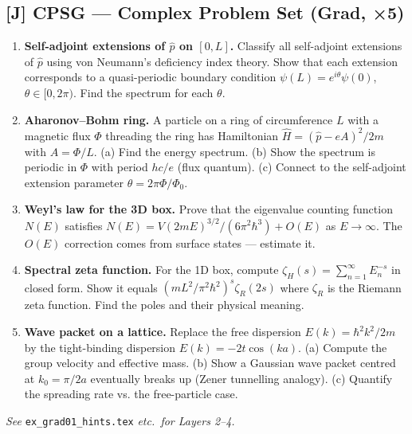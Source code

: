 \subsection*{[J] CPSG — Complex Problem Set (Grad, ×5)}
\begin{tcolorbox}[gradprobbox, title={CPSG · L01 · Tiers 4–5 · 5–10 hrs}]
\begin{enumerate}[label=\textbf{Ex\arabic*.}]
  \item \textbf{Self-adjoint extensions of $\hat{p}$ on $[0,L]$.}
    Classify all self-adjoint extensions of $\hat{p}$ using von Neumann's deficiency index theory. Show that each extension corresponds to a quasi-periodic boundary condition $\psi(L) = e^{i\theta}\psi(0)$, $\theta\in[0,2\pi)$. Find the spectrum for each $\theta$.
  \item \textbf{Aharonov–Bohm ring.}
    A particle on a ring of circumference $L$ with a magnetic flux $\Phi$ threading the ring has Hamiltonian $\hat{H} = (\hat{p}-eA)^2/2m$ with $A = \Phi/L$. (a) Find the energy spectrum. (b) Show the spectrum is periodic in $\Phi$ with period $hc/e$ (flux quantum). (c) Connect to the self-adjoint extension parameter $\theta = 2\pi\Phi/\Phi_0$.
  \item \textbf{Weyl's law for the 3D box.}
    Prove that the eigenvalue counting function $N(E)$ satisfies $N(E) = V(2mE)^{3/2}/(6\pi^2\hbar^3) + O(E)$ as $E\to\infty$. The $O(E)$ correction comes from surface states — estimate it.
  \item \textbf{Spectral zeta function.}
    For the 1D box, compute $\zeta_H(s) = \sum_{n=1}^\infty E_n^{-s}$ in closed form. Show it equals $(mL^2/\pi^2\hbar^2)^s \zeta_R(2s)$ where $\zeta_R$ is the Riemann zeta function. Find the poles and their physical meaning.
  \item \textbf{Wave packet on a lattice.}
    Replace the free dispersion $E(k)=\hbar^2k^2/2m$ by the tight-binding dispersion $E(k) = -2t\cos(ka)$. (a) Compute the group velocity and effective mass. (b) Show a Gaussian wave packet centred at $k_0 = \pi/2a$ eventually breaks up (Zener tunnelling analogy). (c) Quantify the spreading rate vs. the free-particle case.
\end{enumerate}
\textit{See} \texttt{ex\_grad01\_hints.tex} \textit{etc.\ for Layers 2–4.}
\end{tcolorbox}

